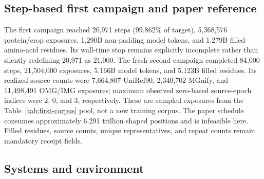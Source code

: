 \documentclass{article}
\begin{document}
\subsection{Step-based first campaign and paper reference}

\begin{table}[H]
  \centering
  \scriptsize
  \setlength{\tabcolsep}{3.5pt}
  \caption{Optimizer-step accounting on four GPUs. Warmup is exactly 10\% of each local target: 2,100 and 8,400 steps. Configured source weights sum to 101 and are normalized to 35.64/10.89/53.47\%.}
  \label{tab:stages}
\end{table}

The first campaign reached 20,971 steps (99.862\% of target), 5,368,576
protein/crop exposures, 1.290B non-padding model tokens, and 1.279B filled
amino-acid residues. Its wall-time stop remains explicitly incomplete rather
than silently redefining 20,971 as 21,000. The fresh second campaign completed
84,000 steps, 21,504,000 exposures, 5.166B model tokens, and 5.123B filled
residues. Its realized source counts were 7,664,807 UniRef90, 2,340,702 MGnify,
and 11,498,491 OMG/IMG exposures; maximum observed zero-based source-epoch
indices were 2, 0, and 3, respectively. These are sampled exposures from the Table~\ref{tab:first-corpus}
pool, not a new training corpus. The paper schedule consumes approximately
6.291 trillion shaped positions and is infeasible here. Filled residues,
source counts, unique representatives, and repeat counts remain mandatory
receipt fields.

\subsection{Systems and environment}
\end{document}
